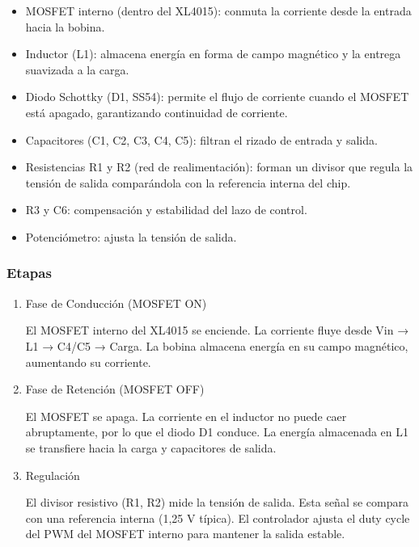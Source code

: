 \documentclass[12pt,a4paper]{article}
\begin{document}
\begin{itemize}

\item MOSFET interno (dentro del XL4015): conmuta la corriente desde la entrada hacia la bobina.

\item Inductor (L1): almacena energía en forma de campo magnético y la entrega suavizada a la carga.

\item Diodo Schottky (D1, SS54): permite el flujo de corriente cuando el MOSFET está apagado, garantizando continuidad de corriente.

\item Capacitores (C1, C2, C3, C4, C5): filtran el rizado de entrada y salida.

\item Resistencias R1 y R2 (red de realimentación): forman un divisor que regula la tensión de salida comparándola con la referencia interna del chip.

\item R3 y C6: compensación y estabilidad del lazo de control.

\item Potenciómetro: ajusta la tensión de salida.

\end{itemize}

\subsubsection{Etapas}

\begin{enumerate}
\item Fase de Conducción (MOSFET ON)

El MOSFET interno del XL4015 se enciende. La corriente fluye desde Vin → L1 → C4/C5 → Carga. La bobina almacena energía en su campo magnético, aumentando su corriente.

\item Fase de Retención (MOSFET OFF)

El MOSFET se apaga. La corriente en el inductor no puede caer abruptamente, por lo que el diodo D1 conduce. La energía almacenada en L1 se transfiere hacia la carga y capacitores de salida.

\item Regulación

El divisor resistivo (R1, R2) mide la tensión de salida. Esta señal se compara con una referencia interna (1,25 V típica). El controlador ajusta el duty cycle del PWM del MOSFET interno para mantener la salida estable.
\end{enumerate}
\end{document}
